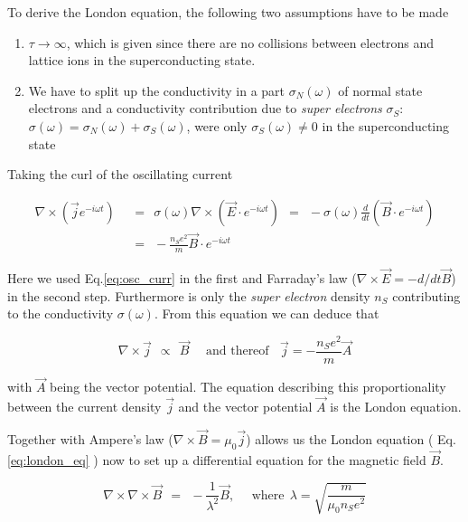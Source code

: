 \documentclass[10pt]{report}
\numberwithin{equation}{chapter}
\newcommand{\myEq}[1]{
  Eq.\ref{#1}
}
\begin{document}
To derive the London equation, the following two assumptions have to be made

\begin{enumerate}
\item{$\tau \rightarrow \infty$, which is given since there are no collisions between electrons and lattice ions in the superconducting state.}
\item{We have to split up the conductivity in a part $\sigma_{N}(\omega)$ of normal state electrons and a conductivity contribution due to \textit{super electrons} $\sigma_{S}$: 
$\sigma(\omega) = \sigma_N(\omega) + \sigma_S(\omega)$, were only $\sigma_S(\omega) \neq 0$ in the superconducting state}
\end{enumerate}


Taking the curl of the oscillating current

\begin{align}\label{eq:curl_curr}
  \nabla \times (\vec{j} e^{-i\omega t}) & ~~=~~ \sigma(\omega) \nabla \times (\vec{E}\cdot e^{-i\omega t}) ~~=~~
  -\sigma(\omega) \frac{d}{dt} (\vec{B} \cdot e^{-i\omega t})\nonumber \\
    & ~~=~~ - \frac{n_Se^2}{m} \vec{B} \cdot e^{-i\omega t}
\end{align}

Here we used \myEq{eq:osc_curr} in the first and Farraday's law ($\nabla \times \vec{E} = -d/dt \vec{B}$) in the second step. Furthermore is only the \textit{super electron} density $n_S$ contributing to the conductivity $\sigma(\omega)$. From this equation we can deduce that

\begin{equation}\label{eq:london_eq}
  \nabla \times \vec{j} ~~\propto~~ \vec{B} ~~~~~~\text{and thereof}~~~~ \vec{j} = -\frac{n_Se^2}{m} \vec{A}
\end{equation}

with $\vec{A}$ being the vector potential. The equation describing this proportionality between the current density $\vec{j}$ and the vector potential $\vec{A}$ is the London equation.


%
Together with Ampere's law ($\nabla \times \vec{B} = \mu_0 \vec{j}$) allows us the London equation (\myEq{eq:london_eq}) now to set up a differential equation for the magnetic field $\vec{B}$.

\begin{equation} \label{eq:deq_B_0}
  \nabla \times \nabla \times \vec{B} ~~=~~ -\frac{1}{\lambda^2} \vec{B}, ~~~~~~ \text{where}~~ 
  \lambda = \sqrt{\frac{m}{\mu_0 n_S e^2}}
\end{equation}
\end{document}
